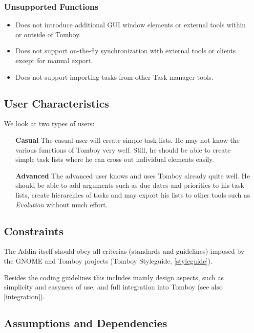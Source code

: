     \subsubsection*{Unsupported Functions}
      \label{description:functions:unsupported}
      \begin{itemize}
        \item Does not introduce additional GUI window elements or external tools within or outside of Tomboy.
        \item Does not support on-the-fly synchronization with external tools or clients except for manual export.
        \item Does not support importing tasks from other Task manager tools.
      \end{itemize}

\subsection{User Characteristics}
\label{description:usercharacteristics}
We look at two types of users:

  \begin{itemize}
    \item[\bf{Casual}] The casual user will create simple task lists. He may not know the various functions of Tomboy very well. Still, he should be able to create simple task lists where he can cross out individual elements easily.

    \item[\bf{Advanced}] The advanced user knows and uses Tomboy already quite well. He should be able to add arguments such as due dates and priorities to his task lists, create hierarchies of tasks and may export his lists to other tools such as \textit{Evolution} without much effort.
  \end{itemize}


\subsection{Constraints}
\label{description:constraints}
The Addin itself should obey all criterias (standards and guidelines) imposed by the GNOME and Tomboy projects (Tomboy Styleguide, \ref{styleguide}).

Besides the coding guidelines this includes mainly design aspects, such as simplicity and easyness of use, and full integration into Tomboy (see also \ref{integration}).


\subsection{Assumptions and Dependencies}
\label{description:assumptions}

